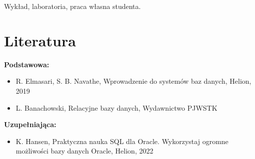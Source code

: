 \documentclass[12pt, a4paper]{article}
\begin{document}
Wykład, laboratoria, praca własna studenta.

\section{Literatura}

\textbf{Podstawowa:}
\begin{itemize}
  \item R. Elmasari, S. B. Navathe, Wprowadzenie do systemów baz danych, Helion, 2019
  \item L. Banachowski, Relacyjne bazy danych, Wydawnictwo PJWSTK
\end{itemize}

\textbf{Uzupełniająca:}
\begin{itemize}
  \item K. Hansen, Praktyczna nauka SQL dla Oracle. Wykorzystaj ogromne możliwości bazy danych Oracle, Helion, 2022
\end{itemize}
\end{document}
